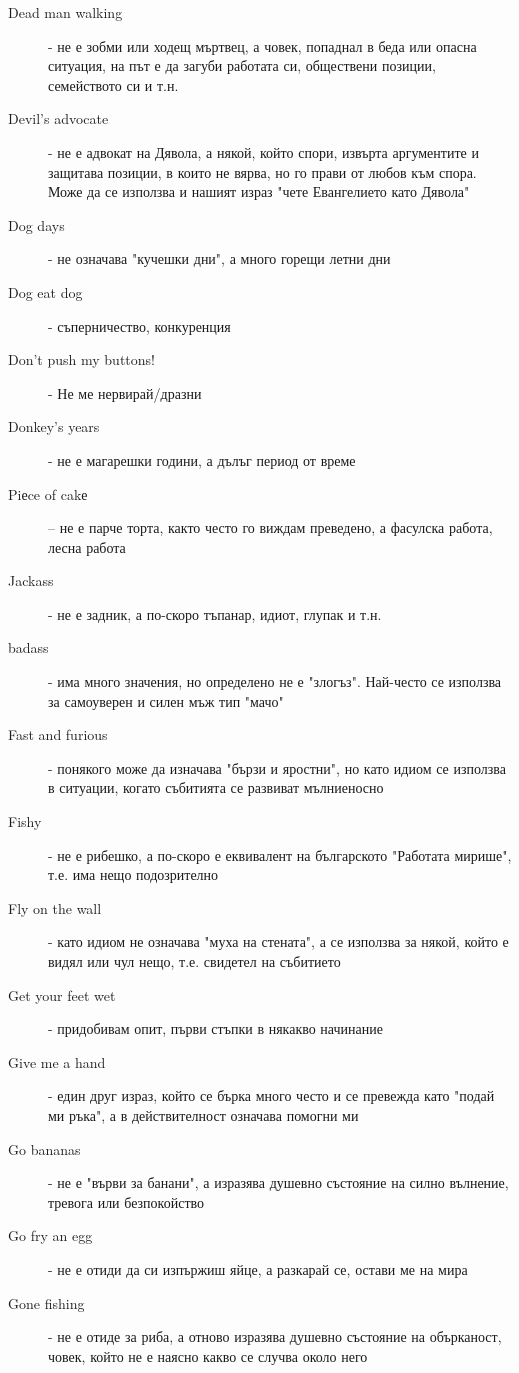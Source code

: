 \begin{description}
    \item[Dead man walking] - не е зобми или ходещ мъртвец, а човек, попаднал в беда или опасна ситуация, на път е да загуби работата си, обществени позиции, семейството си и т.н.
    \item[Devil's advocate] - не е адвокат на Дявола, а някой, който спори, извърта аргументите и защитава позиции, в които не вярва, но го прави от любов към спора. Може да се използва и нашият израз "чете Евангелието като Дявола"
    \item[Dog days] - не означава "кучешки дни", а много горещи летни дни
    \item[Dog eat dog] - съперничество, конкуренция
    \item[Don't push my buttons!] - Не ме нервирай/дразни
    \item[Donkey's years] - не е магарешки години, а дълъг период от време
    \item[Piеce of cakе] – не е парче торта, както често го виждам преведено, а фасулска работа, лесна работа
    \item[Jackass] - не е задник, а по-скоро тъпанар, идиот, глупак и т.н.
    \item[badass] - има много значения, но определено не е "злогъз". Най-често се използва за самоуверен и силен мъж тип "мачо"
    \item[Fast and furious] - понякого може да изначава "бързи и яростни", но като идиом се използва в ситуации, когато събитията се развиват мълниеносно
    \item[Fishy] - не е рибешко, а по-скоро е еквивалент на българското "Работата мирише", т.е. има нещо подозрително
    \item[Fly on the wall] - като идиом не означава "муха на стената", а се използва за някой, който е видял или чул нещо, т.е. свидетел на събитието
    \item[Get your feet wet] - придобивам опит, първи стъпки в някакво начинание
    \item[Give me a hand] - един друг израз, който се бърка много често и се превежда като "подай ми ръка", а в действителност означава помогни ми
    \item[Go bananas] - не е "върви за банани", а изразява душевно състояние на силно вълнение, тревога или безпокойство
    \item[Go fry an egg] - не е отиди да си изпържиш яйце, а разкарай се, остави ме на мира
    \item[Gone fishing] - не е отиде за риба, а отново изразява душевно състояние на обърканост, човек, който не е наясно какво се случва около него

\end{description}
